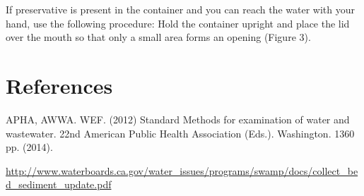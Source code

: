 \documentclass[12pt]{../SOP3_beta}\usepackage[]{graphicx}\usepackage[]{xcolor}
\begin{document}
\NP If preservative is present in the container and you can reach the water with your hand, use the following procedure:  Hold the container upright and place the lid over the mouth so that only a small area forms an opening (Figure 3).

\NP

\section{References}

\NP APHA, AWWA. WEF. (2012) Standard Methods for examination of water and wastewater. 22nd American Public Health Association (Eds.). Washington. 1360 pp. (2014).

\NP \url{http://www.waterboards.ca.gov/water_issues/programs/swamp/docs/collect_bed_sediment_update.pdf}
\end{document}

